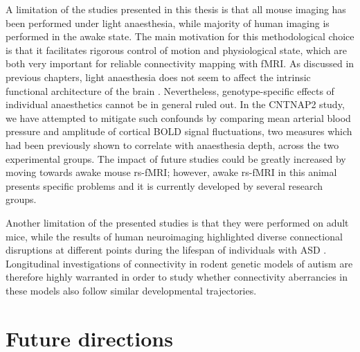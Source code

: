 A limitation of the studies presented in this thesis is that  all mouse imaging
has been performed under light anaesthesia, while majority of human imaging is
performed in the awake state. The main motivation for this methodological choice
is that it facilitates rigorous control of motion and physiological state, which
are both very important for reliable connectivity mapping with fMRI. As
discussed in previous chapters, light anaesthesia does not seem to affect the
intrinsic functional architecture of the brain \parencite{gozzi2016}.
Nevertheless, genotype-specific effects of individual anaesthetics cannot be in
general ruled out. In the CNTNAP2 study, we have attempted to mitigate such
confounds by comparing mean arterial blood pressure and amplitude of cortical
BOLD signal fluctuations, two measures which had been previously shown to
correlate with anaesthesia depth, across the two experimental groups. The impact
of future studies could be greatly increased by moving towards awake mouse
rs-fMRI; however, awake rs-fMRI in this animal presents specific problems and it
is currently developed by several research groups.

Another limitation of the presented studies is that they were performed on adult
mice, while the results of human neuroimaging highlighted diverse connectional
disruptions at different points during the lifespan of individuals with ASD
\parencite{ecker2015}. Longitudinal investigations of connectivity in rodent
genetic models of autism are therefore highly warranted in order to study
whether connectivity aberrancies in these models also follow similar
developmental trajectories.

\section{Future directions}

